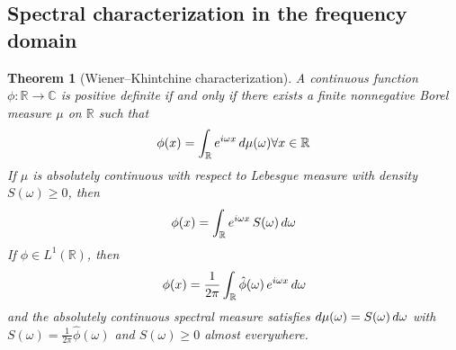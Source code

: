 \documentclass{article}
\newtheorem{theorem}{Theorem}
\begin{document}
\subsection{Spectral characterization in the frequency domain}

\begin{theorem}
  [Wiener--Khintchine characterization] A continuous function $\phi :
  \mathbb{R} \to \mathbb{C}$ is positive definite if and only if there exists
  a finite nonnegative Borel measure $\mu$ on $\mathbb{R}$ such that
  \begin{equation}
    \phi (x) = \int_{\mathbb{R}} e^{i \omega x}  \hspace{0.17em} d \mu
    (\omega) \forall x \in \mathbb{R}
  \end{equation}
  If $\mu$ is absolutely continuous with respect to Lebesgue measure with
  density $S (\omega) \ge 0$, then
  \begin{equation}
    \phi (x) = \int_{\mathbb{R}} e^{i \omega x}  \hspace{0.17em} S (\omega) 
    \hspace{0.17em} d \omega
  \end{equation}
  If $\phi \in L^1 (\mathbb{R})$, then
  \begin{equation}
    \phi (x) = \frac{1}{2 \pi}  \int_{\mathbb{R}} \hat{\phi} (\omega) 
    \hspace{0.17em} e^{i \omega x}  \hspace{0.17em} d \omega
  \end{equation}
  and the absolutely continuous spectral measure satisfies $d \mu (\omega) = S
  (\omega)  \hspace{0.17em} d \omega$ with $S (\omega) = \frac{1}{2 \pi} 
  \hat{\phi} (\omega)$ and $S (\omega) \ge 0$ almost everywhere.
\end{theorem}
\end{document}

